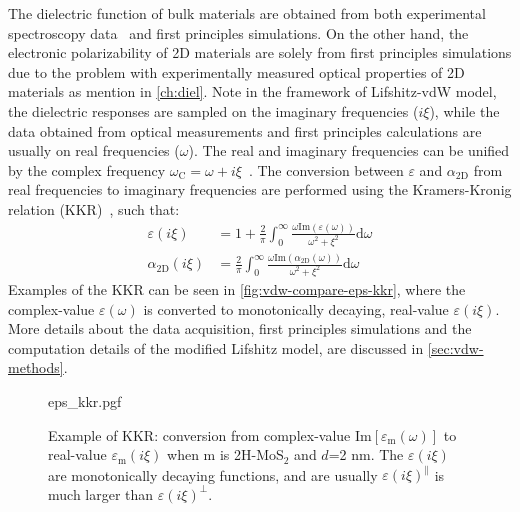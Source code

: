 The dielectric function of bulk materials are obtained from both
experimental spectroscopy data~\cite{Palik_1998_handbook} and first
principles simulations.
%
On the other hand, the electronic polarizability of 2D materials are
solely from first principles simulations due to the problem with
experimentally measured optical properties of 2D materials as mention
in \autoref{ch:diel}.
%
Note in the framework of Lifshitz-vdW model, the dielectric responses
are sampled on the imaginary frequencies ($i\xi$), while the data
obtained from optical measurements and first principles calculations
are usually on real frequencies ($\omega$). The real and imaginary
frequencies can be unified by the complex frequency
$\omega_{\mathrm{C}} = \omega + i\xi$~\cite{parsegian_van_2010_book}.
%
The conversion between $\varepsilon$ and $\alpha_{\mathrm{2D}}$ from
real frequencies to imaginary frequencies are performed using the
Kramers-Kronig relation (KKR)~\cite{Roessler_1965_KKR}, such that:
\begin{eqnarray}
  \label{eq:vdw-KKR-eps}
  \varepsilon(i\xi) &= 1 + {\displaystyle \frac{2}{\pi}}{\displaystyle \int_{0}^{\infty}} {\displaystyle \frac{\omega \mathrm{Im}(\varepsilon(\omega))}{\omega^{2} + \xi^{2}}} \mathrm{d}\omega \\
  \label{eq:vdw-KKR-alpha}
  \alpha_{\mathrm{2D}}(i\xi) &= {\displaystyle \frac{2}{\pi}} {\displaystyle \int_{0}^{\infty}} {\displaystyle \frac{\omega \mathrm{Im}(\alpha_{\mathrm{2D}}(\omega))}{\omega^{2} + \xi^{2}}} \mathrm{d}\omega
\end{eqnarray}
%
Examples of the KKR can be seen in \autoref{fig:vdw-compare-eps-kkr}, where the complex-value $\varepsilon(\omega)$ is converted to monotonically decaying, real-value $\varepsilon(i \xi)$. 
More details about the data acquisition, first principles simulations
and the computation details of the modified Lifshitz model, are
discussed in \autoref{sec:vdw-methods}.

\begin{figure}[!htbp]
  \centering{}
  {eps_kkr.pgf}
  \caption{\label{fig:vdw-compare-eps-kkr} %
    Example of KKR: conversion from complex-value
    $\mathrm{Im}[\varepsilon_{\mathrm{m}}(\omega)]$ to real-value
    $\varepsilon_{\mathrm{m}}(i \xi)$ when m is 2H-MoS$_{2}$ and $d$=2
    nm. The $\varepsilon(i \xi)$ are monotonically decaying functions,
    and are usually $\varepsilon(i \xi)^{\parallel}$ is much larger
    than $\varepsilon(i \xi)^{\perp}$.}
\end{figure}


